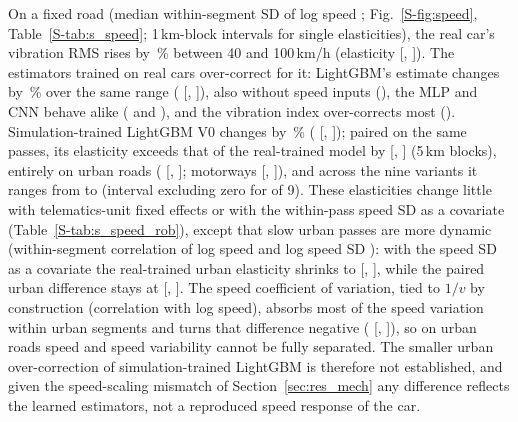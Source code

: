 On a fixed road (median within-segment SD of log speed \elSdLogv; Fig.~\ref{S-fig:speed}, Table~\ref{S-tab:s_speed}; 1\,km-block intervals for single elasticities), the real car's vibration RMS rises by \elRawPooledPct\,\% between 40 and 100\,km/h (elasticity \elRawPooled{} [\elRawPooledLo, \elRawPooledHi]).
The estimators trained on real cars over-correct for it: LightGBM's estimate changes by \elRealGbmPooledPct\,\% over the same range (\elRealGbmPooled{} [\elRealGbmPooledLo, \elRealGbmPooledHi]), also without speed inputs (\elRealGbmNoSpeedPooled), the MLP and CNN behave alike (\elRealMlpPooled{} and \elRealCnnPooled), and the vibration index over-corrects most (\elRealIdxPooled).
Simulation-trained LightGBM V0 changes by \elSimGbmPooledPct\,\% (\elSimGbmPooled{} [\elSimGbmPooledLo, \elSimGbmPooledHi]); paired on the same passes, its elasticity exceeds that of the real-trained model by \epVzeroPooled{} [\epVzeroPooledLo, \epVzeroPooledHi] (5\,km blocks), entirely on urban roads (\epVzeroUrban{} [\epVzeroUrbanLo, \epVzeroUrbanHi]; motorways \epVzeroMotorway{} [\epVzeroMotorwayLo, \epVzeroMotorwayHi]), and across the nine variants it ranges from \epMeasPooledMin{} to \epMeasPooledMax{} (interval excluding zero for \epMeasPooledExcl{} of 9).
These elasticities change little with telematics-unit fixed effects or with the within-pass speed SD as a covariate (Table~\ref{S-tab:s_speed_rob}), except that slow urban passes are more dynamic (within-segment correlation of log speed and log speed SD \srCorrLsdUrban): with the speed SD as a covariate the real-trained urban elasticity shrinks to \srRealUrbanLsd{} [\srRealUrbanLsdLo, \srRealUrbanLsdHi], while the paired urban difference stays at \srDiffUrbanLsd{} [\srDiffUrbanLsdLo, \srDiffUrbanLsdHi].
The speed coefficient of variation, tied to $1/v$ by construction (correlation \srCorrCvUrban{} with log speed), absorbs most of the speed variation within urban segments and turns that difference negative (\srDiffUrbanCv{} [\srDiffUrbanCvLo, \srDiffUrbanCvHi]), so on urban roads speed and speed variability cannot be fully separated.
The smaller urban over-correction of simulation-trained LightGBM is therefore not established, and given the speed-scaling mismatch of Section~\ref{sec:res_mech} any difference reflects the learned estimators, not a reproduced speed response of the car.

